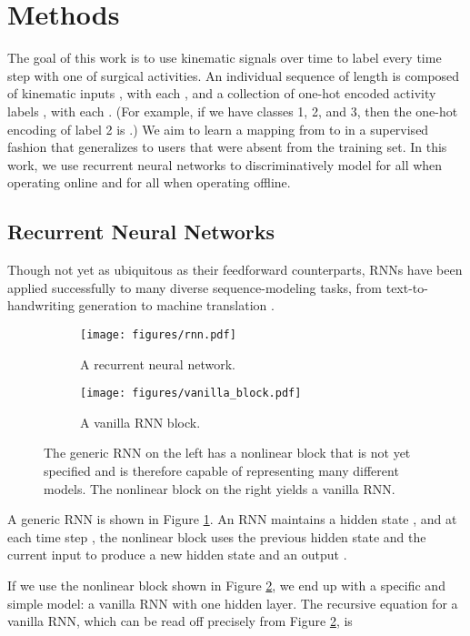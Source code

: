 \documentclass{llncs}
\begin{document}
\section{Methods}\label{sec:methods}

The goal of this work is to use  kinematic signals over time to label every time step with one of  surgical activities. An individual sequence of length  is composed of kinematic inputs , with each , and a collection of one-hot encoded activity labels , with each . (For example, if we have classes 1, 2, and 3, then the one-hot encoding of label 2 is .) We aim to learn a mapping from  to  in a supervised fashion that generalizes to users that were absent from the training set. In this work, we use recurrent neural networks to discriminatively model  for all  when operating online and  for all  when operating offline.

\subsection{Recurrent Neural Networks}

Though not yet as ubiquitous as their feedforward counterparts, RNNs have been applied successfully to many diverse sequence-modeling tasks, from text-to-handwriting generation \cite{graves2013generating} to machine translation \cite{sutskever2014sequence}.
\begin{figure}[t]
	\centering
	\begin{subfigure}[b]{0.55\textwidth}
		\centering
		\texttt{[image: figures/rnn.pdf]}
		\caption{A recurrent neural network.}
		\label{fig:rnn}
	\end{subfigure}
	\hfill
	\begin{subfigure}[b]{0.44\textwidth}
		\centering
		\texttt{[image: figures/vanilla\_block.pdf]}
		\caption{A vanilla RNN block.}
		\label{fig:vanillablock}
	\end{subfigure}
	\caption{The generic RNN on the left has a nonlinear block that is not yet specified and is therefore capable of representing many different models. The nonlinear block on the right yields a vanilla RNN.}
	\label{fig:rnnvanillablock}
\end{figure}

A generic RNN is shown in Figure \ref{fig:rnn}. An RNN maintains a hidden state , and at each time step , the nonlinear block uses the previous hidden state  and the current input  to produce a new hidden state  and an output .

If we use the nonlinear block shown in Figure \ref{fig:vanillablock}, we end up with a specific and simple model: a vanilla RNN with one hidden layer. The recursive equation for a vanilla RNN, which can be read off precisely from Figure \ref{fig:vanillablock}, is
\end{document}
